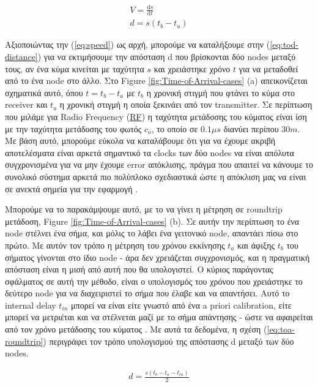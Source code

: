\begin{gather}
	V=\frac{\mathrm{d}s}{\mathrm{d}t} \label{eq:speed} \\
	d=s(t_b-t_a) \label{eq:tod-distance}
\end{gather}

Αξιοποιώντας την (\ref{eq:speed}) ως αρχή, μπορούμε να καταλήξουμε στην (\ref{eq:tod-distance}) για να εκτιμήσουμε
την απόσταση d που βρίσκονται δύο nodes μεταξύ τους, αν ένα κύμα κινείται με ταχύτητα $s$ και χρειάστηκε 
χρόνο $t$ για να μεταδοθεί από το ένα node στο άλλο. Στο Figure \ref{fig:Time-of-Arrival-cases} (a) απεικονίζεται
σχηματικά αυτό, όπου $t=t_b-t_a$ με $t_b$ η χρονική στιγμή που φτάνει το κύμα στο receiver και $t_a$
η χρονική στιγμή η οποία ξεκινάει από τον transmitter. Σε περίπτωση που μιλάμε για Radio Frequency 
(\hyperref[abbr:RF]{RF}) η ταχύτητα μετάδοσης του κύματος είναι ίση με την ταχύτητα μετάδοσης του φωτός $c_o$, το οποίο 
σε $0.1μs$ διανύει περίπου $30m$.   
Με βάση αυτό, μπορούμε εύκολα να καταλάβουμε ότι για να έχουμε ακριβή αποτελέσματα είναι αρκετά σημαντικό
τα clocks των δύο nodes να είναι απόλυτα συγχρονισμένα για να μην έχουμε error απόκλισης, πράγμα που
απαιτεί να κάνουμε το συνολικό σύστημα αρκετά πιο πολύπλοκο σχεδιαστικά 
ώστε η απόκλιση μας να είναι σε ανεκτά σημεία για την εφαρμογή \cite{wsn-Localization-systems} \cite{wsn-Localization-techniques}.

Μπορούμε να το παρακάμψουμε αυτό, με το να γίνει η μέτρηση σε roundtrip μετάδοση, Figure \ref{fig:Time-of-Arrival-cases} (b).
Σε αυτήν την περίπτωση το ένα node στέλνει ένα σήμα, και μόλις το λάβει ένα γειτονικό node, απαντάει πίσω στο πρώτο. 
Με αυτόν τον τρόπο η μέτρηση του χρόνου εκκίνησης $t_a$ και άφιξης $t_b$ του σήματος γίνονται στο ίδιο node - 
άρα δεν χρειάζεται συγχρονισμός, και η πραγματική απόσταση είναι η μισή από αυτή που θα υπολογιστεί. Ο κύριος παράγοντας
σφάλματος σε αυτή την μέθοδο, είναι ο υπολογισμός του χρόνου που χρειάστηκε το δεύτερο node για να διαχειριστεί
το σήμα που έλαβε και να απαντήσει. Αυτό το internal delay $t_{in}$ μπορεί να είναι είτε γνωστό από 
ένα a priori calibration, είτε μπορεί να μετριέται και να στέλνεται μαζί με το σήμα απάντησης - ώστε να αφαιρείται
από τον χρόνο μετάδοσης του κύματος \cite{wsn-Localization-techniques}.
Με αυτά τα δεδομένα, η σχέση (\ref{eq:toa-roundtrip}) περιγράφει τον τρόπο υπολογισμού της
απόστασης d μεταξύ των δύο nodes.

\begin{align}
	d=\frac{s(t_b-t_a-t_{in})}{2} \label{eq:toa-roundtrip}
\end{align}


